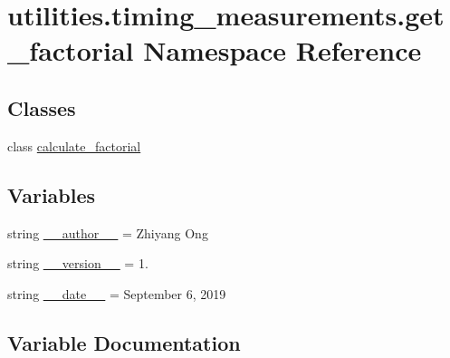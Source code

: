 \hypertarget{namespaceutilities_1_1timing__measurements_1_1get__factorial}{}\section{utilities.\+timing\+\_\+measurements.\+get\+\_\+factorial Namespace Reference}
\label{namespaceutilities_1_1timing__measurements_1_1get__factorial}
\subsection*{Classes}
\begin{DoxyCompactItemize}
\item 
class \hyperlink{classutilities_1_1timing__measurements_1_1get__factorial_1_1calculate__factorial}{calculate\+\_\+factorial}
\end{DoxyCompactItemize}
\subsection*{Variables}
\begin{DoxyCompactItemize}
\item 
string \hyperlink{namespaceutilities_1_1timing__measurements_1_1get__factorial_a043c91cb8f16c3570870212cabbde3c1}{\+\_\+\+\_\+author\+\_\+\+\_\+} = \textquotesingle{}Zhiyang Ong\textquotesingle{}
\item 
string \hyperlink{namespaceutilities_1_1timing__measurements_1_1get__factorial_af4911964913b4a07e464413868da36f7}{\+\_\+\+\_\+version\+\_\+\+\_\+} = \textquotesingle{}1.\textquotesingle{}
\item 
string \hyperlink{namespaceutilities_1_1timing__measurements_1_1get__factorial_a8b8b3f7bee60cdc7d63a3f6357047a30}{\+\_\+\+\_\+date\+\_\+\+\_\+} = \textquotesingle{}September 6, 2019\textquotesingle{}
\end{DoxyCompactItemize}


\subsection{Variable Documentation}
\hypertarget{namespaceutilities_1_1timing__measurements_1_1get__factorial_a043c91cb8f16c3570870212cabbde3c1}{}
